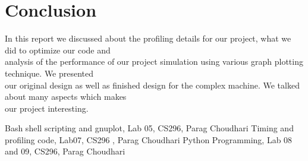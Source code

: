 \documentclass[11pt]{article}
\begin{document}
\section{Conclusion}
In this report we discussed about the profiling details for our project, what we did to optimize our code and \\
analysis of the performance of our project simulation using various graph plotting technique. We presented \\
our original design as well as finished design for the complex machine. We talked about many aspects  which makes \\ 
our project interesting.

\begin{thebibliography}{2}
	  Bash shell scripting and gnuplot,
	  Lab 05, CS296,
	  Parag Choudhari
	  Timing and profiling code,
	  Lab07, CS296 ,
	  Parag Choudhari
	  Python Programming,
	  Lab 08 and 09, CS296,
	  Parag Choudhari
	   

\end{thebibliography}
\end{document}
